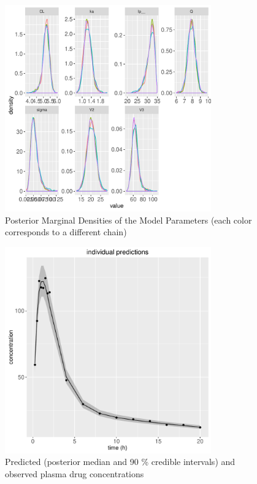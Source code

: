 \documentclass[11pt]{amsart}
\begin{document}
\begin{figure}[htbp]
\begin{center}
\includegraphics[width=3.5in,trim=0in 0in 0 0in]{graphics/TwoCptModelExamplePlots004.pdf}
\caption{{Posterior Marginal Densities of the Model Parameters (each color corresponds to a different chain)}}
\label{MCMC1}
\end{center}
\end{figure}

\begin{figure}[htbp]
\begin{center}
\includegraphics[width=3.5in,trim=0in 0in 0 0in]{graphics/TwoCptModelExamplePlots006.pdf}
\caption{{Predicted (posterior median and 90 \% credible intervals) and observed plasma drug concentrations}}
\label{predictions}
\end{center}
\end{figure}
\end{document}
